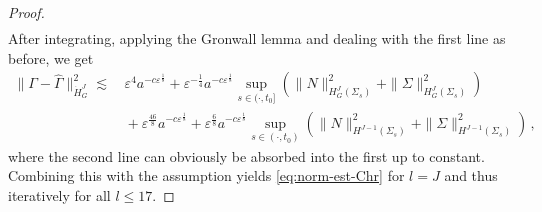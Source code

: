 \documentclass[11pt,leqno,textwidth=10cm]{amsart}
\numberwithin{equation}{section}
\theoremstyle{definition}
\theoremstyle{plain}
\newcommand{\1}{\mathbbm{1}}
\renewcommand{\epsilon}{\varepsilon}
\newcommand{\Gamhat}{\hat{\Gamma}}
\begin{document}
\begin{proof}
\begin{align*}
\end{align*}
After integrating, applying the Gronwall lemma and dealing with the first line as before, we get
\begin{align*}
\|\Gamma-\Gamhat\|_{\dot{H}^J_G}^2\lesssim&\,\epsilon^4a^{-c\epsilon^\frac18}+\epsilon^{-\frac14}a^{-c\epsilon^\frac18}\sup_{s\in(\cdot,t_0]}\left(\|N\|_{H^J_G(\Sigma_s)}^2+\|\Sigma\|_{H^J_G(\Sigma_s)}^2\right)\\
&\,+\epsilon^\frac{46}8a^{-c\epsilon^\frac18}+\epsilon^\frac{6}8a^{-c\epsilon^\frac18}\sup_{s\in(\cdot,t_0)}\left(\|N\|_{H^{J-1}(\Sigma_s)}^2+\|\Sigma\|_{H^{J-1}(\Sigma_s)}^2\right)\,,
\end{align*}
where the second line can obviously be absorbed into the first up to constant. Combining this with the assumption yields \eqref{eq:norm-est-Chr} for $l=J$ and thus iteratively for all $l\leq 17$.
\end{proof}
\end{document}
